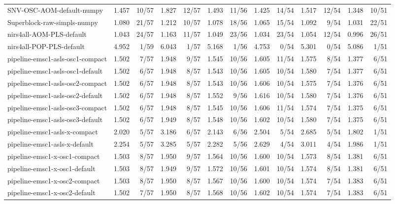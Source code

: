 \begin{tabular}{lrrrrrrrrrrrr}
SNV-OSC-AOM-default-numpy & 1.457 & 10/57 & 1.827 & 12/57 & 1.493 & 11/56 & 1.425 & 14/54 & 1.517 & 12/54 & 1.348 & 10/51 \\
Superblock-raw-simpls-numpy & 1.080 & 21/57 & 1.212 & 10/57 & 1.078 & 18/56 & 1.065 & 15/54 & 1.092 & 9/54 & 1.031 & 22/51 \\
nirs4all-AOM-PLS-default & 1.043 & 24/57 & 1.163 & 11/57 & 1.049 & 23/56 & 1.034 & 23/54 & 1.054 & 12/54 & 0.996 & 26/51 \\
nirs4all-POP-PLS-default & 4.952 & 1/59 & 6.043 & 1/57 & 5.168 & 1/56 & 4.753 & 0/54 & 5.301 & 0/54 & 5.086 & 1/51 \\
pipeline-emsc1-asls-osc1-compact & 1.502 & 7/57 & 1.948 & 9/57 & 1.545 & 10/56 & 1.605 & 11/54 & 1.575 & 8/54 & 1.377 & 6/51 \\
pipeline-emsc1-asls-osc1-default & 1.502 & 6/57 & 1.948 & 8/57 & 1.543 & 10/56 & 1.605 & 10/54 & 1.580 & 7/54 & 1.377 & 6/51 \\
pipeline-emsc1-asls-osc2-compact & 1.502 & 6/57 & 1.948 & 8/57 & 1.543 & 10/56 & 1.606 & 10/54 & 1.575 & 7/54 & 1.376 & 6/51 \\
pipeline-emsc1-asls-osc2-default & 1.502 & 6/57 & 1.948 & 8/57 & 1.552 & 9/56 & 1.616 & 10/54 & 1.580 & 7/54 & 1.376 & 6/51 \\
pipeline-emsc1-asls-osc3-compact & 1.502 & 6/57 & 1.948 & 8/57 & 1.545 & 10/56 & 1.606 & 11/54 & 1.574 & 7/54 & 1.375 & 6/51 \\
pipeline-emsc1-asls-osc3-default & 1.502 & 6/57 & 1.949 & 8/57 & 1.548 & 10/56 & 1.602 & 10/54 & 1.580 & 7/54 & 1.375 & 6/51 \\
pipeline-emsc1-asls-x-compact & 2.020 & 5/57 & 3.186 & 6/57 & 2.143 & 6/56 & 2.504 & 5/54 & 2.685 & 5/54 & 1.802 & 1/51 \\
pipeline-emsc1-asls-x-default & 2.254 & 5/57 & 3.285 & 5/57 & 2.282 & 5/56 & 2.629 & 4/54 & 3.011 & 4/54 & 1.986 & 1/51 \\
pipeline-emsc1-x-osc1-compact & 1.503 & 8/57 & 1.950 & 9/57 & 1.564 & 10/56 & 1.600 & 10/54 & 1.573 & 8/54 & 1.381 & 6/51 \\
pipeline-emsc1-x-osc1-default & 1.503 & 8/57 & 1.949 & 9/57 & 1.572 & 10/56 & 1.601 & 10/54 & 1.574 & 8/54 & 1.381 & 6/51 \\
pipeline-emsc1-x-osc2-compact & 1.503 & 8/57 & 1.950 & 8/57 & 1.567 & 10/56 & 1.600 & 10/54 & 1.574 & 7/54 & 1.383 & 6/51 \\
pipeline-emsc1-x-osc2-default & 1.502 & 7/57 & 1.950 & 8/57 & 1.568 & 10/56 & 1.602 & 10/54 & 1.574 & 7/54 & 1.383 & 6/51 \\

\end{tabular}
